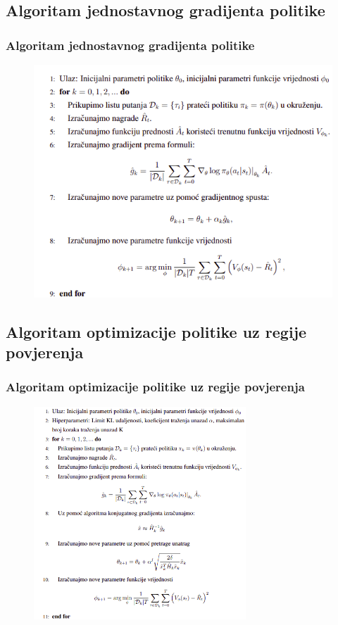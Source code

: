 \documentclass{beamer}
\begin{document}
\subsection{Algoritam jednostavnog gradijenta politike}

\begin{frame}
	\frametitle{Algoritam jednostavnog gradijenta politike}

	\begin{figure}[h!]
		\centering
		\includegraphics[width=\columnwidth]{img/vpg.png}
	\end{figure}

\end{frame}


\subsection{Algoritam optimizacije politike uz regije povjerenja}

\begin{frame}
	\frametitle{Algoritam optimizacije politike uz regije povjerenja}

	\begin{figure}[h!]
		\centering
		\includegraphics[height=8cm]{img/trpo.png}
	\end{figure}

\end{frame}
\end{document}
